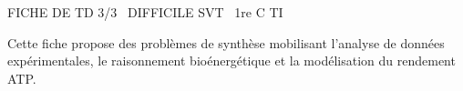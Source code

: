 \documentclass[11pt]{article}
\begin{document}
\begin{tcolorbox}[enhanced,colback=popink,colframe=popink,arc=10pt,boxrule=0pt,left=12pt,right=12pt,top=9pt,bottom=9pt]
{\color{white}\popxbold\small FICHE DE TD 3/3 \textbullet\ DIFFICILE \hfill SVT \textbullet\ 1re C TI\par}
\end{tcolorbox}
\vspace{4pt}
Cette fiche propose des problèmes de synthèse mobilisant l'analyse de données expérimentales, le raisonnement bioénergétique et la modélisation du rendement ATP.
\end{document}
